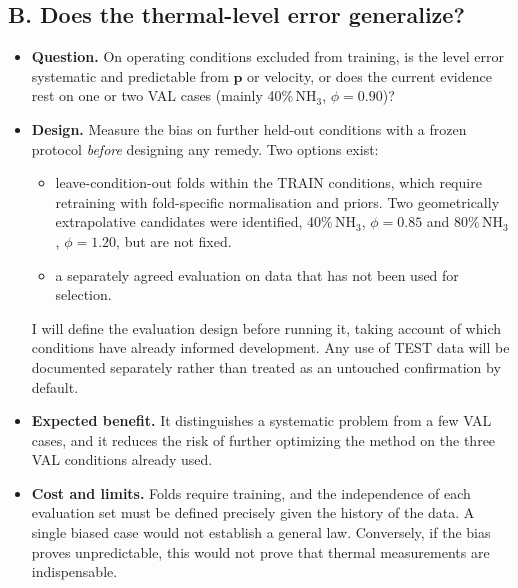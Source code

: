 \documentclass[11pt,letterpaper]{article}
\newcommand{\NH}{\text{NH}_3}
\newcommand{\cond}[2]{#1\%\,$\NH$, $\phi{=}#2$}
\begin{document}
\subsection*{B. Does the thermal-level error generalize?}
\begin{itemize}
  \item \textbf{Question.} On operating conditions excluded from training, is the level error systematic and predictable from $\mathbf{p}$ or velocity, or does the current evidence rest on one or two VAL cases (mainly \cond{40}{0.90})?
  \item \textbf{Design.} Measure the bias on further held-out conditions with a frozen protocol \emph{before} designing any remedy. Two options exist:
  \begin{itemize}
    \item leave-condition-out folds within the TRAIN conditions, which require retraining with fold-specific normalisation and priors. Two geometrically extrapolative candidates were identified, \cond{40}{0.85} and \cond{80}{1.20}, but are not fixed.
    \item a separately agreed evaluation on data that has not been used for selection.
  \end{itemize}
  I will define the evaluation design before running it, taking account of which conditions have already informed development. Any use of TEST data will be documented separately rather than treated as an untouched confirmation by default.
  \item \textbf{Expected benefit.} It distinguishes a systematic problem from a few VAL cases, and it reduces the risk of further optimizing the method on the three VAL conditions already used.
  \item \textbf{Cost and limits.} Folds require training, and the independence of each evaluation set must be defined precisely given the history of the data. A single biased case would not establish a general law. Conversely, if the bias proves unpredictable, this would not prove that thermal measurements are indispensable.
\end{itemize}
\end{document}

